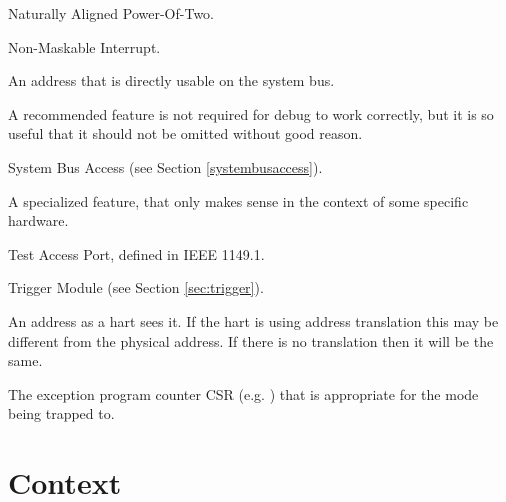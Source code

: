 \begin{description}[style=nextline]
    \item[NAPOT]
        Naturally Aligned Power-Of-Two.
    \item[NMI]
        Non-Maskable Interrupt.
    \item[physical address]
        An address that is directly usable on the system bus.
    \item[recommended feature]
        A recommended feature is not required for debug to work correctly, but
        it is so useful that it should not be omitted without good reason.
    \item[SBA]
        System Bus Access (see Section \ref{systembusaccess}).
    \item[specialized feature]
        A specialized feature, that only makes sense in the context of some
        specific hardware.
    \item[TAP]
        Test Access Port, defined in IEEE 1149.1.
    \item[TM]
        Trigger Module (see Section \ref{sec:trigger}).
    \item[virtual address]
        An address as a hart sees it. If the hart is using address translation this
        may be different from the physical address. If there is no
        translation then it will be the same.
    \item[\Rxepc]
        The exception program counter CSR (e.g. \Rmepc) that is appropriate for
        the mode being trapped to.
\end{description}

\section{Context}

